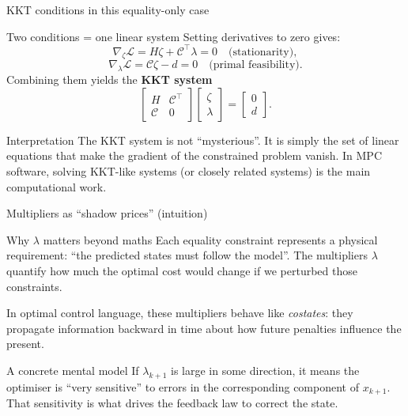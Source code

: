 \documentclass[aspectratio=169,11pt]{beamer}
\begin{document}
\begin{frame}{KKT conditions in this equality-only case}
\begin{block}{Two conditions = one linear system}
Setting derivatives to zero gives:
\[
\nabla_{\zeta}\mathcal{L} = H\zeta + \mathcal{C}^\top\lambda = 0\quad\text{(stationarity)},
\]
\[
\nabla_{\lambda}\mathcal{L} = \mathcal{C}\zeta - d = 0\quad\text{(primal feasibility)}.
\]
Combining them yields the \textbf{KKT system}
\[
\begin{bmatrix}
H & \mathcal{C}^\top\\
\mathcal{C} & 0
\end{bmatrix}
\begin{bmatrix}
\zeta\\\lambda
\end{bmatrix}
=
\begin{bmatrix}
0\\d
\end{bmatrix}.
\]
\end{block}

\begin{alertblock}{Interpretation}
The KKT system is not ``mysterious''. It is simply the set of linear equations that make the gradient of the constrained problem vanish.
In MPC software, solving KKT-like systems (or closely related systems) is the main computational work.
\end{alertblock}
\end{frame}

\begin{frame}{Multipliers as ``shadow prices'' (intuition)}
\begin{block}{Why $\lambda$ matters beyond maths}
Each equality constraint represents a physical requirement: ``the predicted states must follow the model''. The multipliers $\lambda$ quantify how much the optimal cost would change if we perturbed those constraints.

In optimal control language, these multipliers behave like \emph{costates}: they propagate information backward in time about how future penalties influence the present.
\end{block}

\begin{exampleblock}{A concrete mental model}
If $\lambda_{k+1}$ is large in some direction, it means the optimiser is ``very sensitive'' to errors in the corresponding component of $x_{k+1}$. That sensitivity is what drives the feedback law to correct the state.
\end{exampleblock}
\end{frame}
\end{document}
